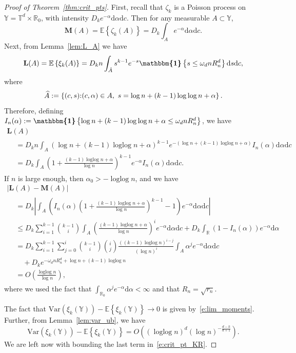 \documentclass[AHL,Unicode,longabstracts]{cedram}
\DeclareMathOperator{\logg}{\log\log}
\newcommand*\bL{\mathbf{L}}
\newcommand*\bM{\mathbf{M}}
\newcommand*\R{\mathbb{R}}
\newcommand*\T{\mathbb{T}}
\newcommand*\Y{\mathbb{Y}}
\newcommand{\E}{\mathbb{E}}
\newcommand*\md{\mathrm{d}}
\newcommand{\mean}[1] {\E\left\{{#1}\right\}}
\newcommand{\ind}{\boldsymbol{\mathbbm{1}}}
\newcommand{\var}[1]{\mathrm{Var}\param{{#1}}}
\newcommand{\set}[1]{\left\{#1\right\}}
\newcommand{\param}[1]{\left(#1\right)}
\newcommand{\abs}[1] {\left| {#1}\right|}
\let\oldhat\hat
\renewcommand*{\hat}[1]{\mathchoice{\widehat{#1}}{\widehat{#1}}{\oldhat{#1}}{\oldhat{#1}}}
\begin{document}
\begin{proof}[Proof of Theorem~\ref{thm:crit_pts}]
First, recall that $\zeta_k$ is a Poisson process on $\Y = \T^d\times\R_0$, with intensity $D_k e^{-\alpha}\md\alpha \md c$. Then for any measurable $A\subset \Y$,
\[
\bM(A) = \mean{\zeta_k(A)} = D_k\int_A e^{-\alpha}\md\alpha \md c.
\]
Next, from Lemma~\ref{lem:L_A} we have
\[
\bL(A) = \mean{\xi_k(A)} = D_k n \int_{\hat A} s^{k-1}e^{-s} \ind\set{s\le \omega_d n R_n^d } \md s \md c,
\]
where
\[
\hat A := \set{(c,s) {:} (c,\alpha)\in A,\ s = \log n + (k-1)\logg n + \alpha}.
\]
Therefore, defining $I_n(\alpha):= \ind\set{\log n + (k-1)\logg n + \alpha \le \omega_d n R_n^d}$, we have
\begin{multline}\label{e:defnLcrit}
\bL(A)\\
\begin{aligned}
&= D_k n \int_{A} \left(\log n + (k-1)\logg n + \alpha\right)^{k-1}e^{-\left(\log n + (k-1)\logg n + \alpha\right)} I_n(\alpha) \md\alpha \md c \\
&= D_k \int_{A} \param{1+\frac{ (k-1)\logg n + \alpha}{\log n}}^{k-1} e^{- \alpha} I_n(\alpha) \md\alpha \md c.
\end{aligned}
\end{multline}
If $n$ is large enough, then $\alpha_0 > -\logg n$, and we have
\begin{multline}\label{e:cp_bound_1}
\left|\bL(A)-\bM(A)\right|\\
\begin{aligned}
&= D_k \abs{\int_{A} \param{I_n(\alpha)\param{1+\frac{(k-1)\logg n+ \alpha}{\log n}}^{k-1}-1}e^{-\alpha} \md\alpha \md c}\\
&\le D_k \sum_{i=1}^{k-1}\binom{k-1}{i} \int_{A}\param{\frac{(k-1)\logg n + \alpha}{\log n}}^i e^{-\alpha} \md\alpha \md c + D_k \int_{\R} (1-I_n(\alpha)) e^{-\alpha} \md \alpha\\
&= D_k \sum_{i=1}^{k-1}\sum_{j=0}^{i}\binom{k-1}{i}\binom{i}{j} \frac{((k-1)\logg n)^{i-j}}{(\log n)^i}\int_{A} \alpha^j e^{-\alpha}\md\alpha \md c \\
& \quad + D_k e^{-\omega_d n R_n^d +\log n +(k-1)\logg n}\\
&= O\param{\frac{\logg n}{\log n}},
\end{aligned}
\end{multline}
where we used the fact that $\int_{\R_0}\alpha^j e^{-\alpha}\md\alpha < \infty$ and that $R_n=\sqrt{r_n}$.

The fact that $\var{\xi_k(\Y)} - \mean{\xi_k(\Y)} \to 0$ is given by~\eqref{e:lim_moments}. Further, from Lemma~\ref{lem:var_ub}, we have
\begin{equation}\label{e:cp_bound_2}
\var{\xi_k(\Y)} - \mean{\xi_k(\Y)} = O\param{(\logg n)^d(\log n)^{-\frac{d-k}{d+1}}}.
\end{equation}
We are left now with bounding the last term in~\eqref{e:crit_pt_KR}.


\end{proof}
\end{document}

